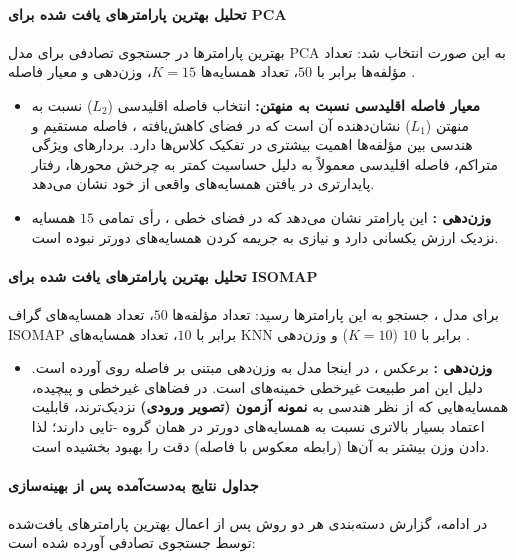 \documentclass{article}
\begin{document}
\paragraph{تحلیل بهترین پارامترهای یافت شده برای PCA}
بهترین پارامترها در جستجوی تصادفی برای مدل PCA به این صورت انتخاب شد: تعداد مؤلفه‌ها برابر با $50$، تعداد همسایه‌ها $K=15$، وزن‌دهی  و معیار فاصله . 
\begin{itemize}
	\item \textbf{معیار فاصله اقلیدسی نسبت به منهتن:} انتخاب فاصله اقلیدسی ($L_2$) نسبت به منهتن ($L_1$) نشان‌دهنده آن است که در فضای کاهش‌یافته ، فاصله مستقیم و هندسی بین مؤلفه‌ها اهمیت بیشتری در تفکیک کلاس‌ها دارد. بردارهای ویژگی متراکم، فاصله اقلیدسی معمولاً به دلیل حساسیت کمتر به چرخش محورها، رفتار پایدارتری در یافتن همسایه‌های واقعی از خود نشان می‌دهد.
	\item \textbf{وزن‌دهی :} این پارامتر نشان می‌دهد که در فضای خطی ، رأی تمامی $15$ همسایه نزدیک ارزش یکسانی دارد و نیازی به جریمه کردن همسایه‌های دورتر نبوده است.
\end{itemize}

\paragraph{تحلیل بهترین پارامترهای یافت شده برای ISOMAP}
برای مدل ، جستجو به این پارامترها رسید: تعداد مؤلفه‌ها $50$، تعداد همسایه‌های گراف ISOMAP برابر با $10$، تعداد همسایه‌های KNN برابر با $10$ ($K=10$) و وزن‌دهی .
\begin{itemize}
	\item \textbf{وزن‌دهی :} برعکس ، در اینجا مدل به وزن‌دهی مبتنی بر فاصله روی آورده است. دلیل این امر طبیعت غیرخطی خمینه‌های  است. در فضاهای غیرخطی و پیچیده، همسایه‌هایی که از نظر هندسی به \textbf{نمونه آزمون (تصویر ورودی)} نزدیک‌ترند، قابلیت اعتماد بسیار بالاتری نسبت به همسایه‌های دورتر در همان گروه -تایی دارند؛ لذا دادن وزن بیشتر به آن‌ها (رابطه معکوس با فاصله) دقت را بهبود بخشیده است.
\end{itemize}

\paragraph{جداول نتایج به‌دست‌آمده پس از بهینه‌سازی}
در ادامه، گزارش دسته‌بندی هر دو روش پس از اعمال بهترین پارامترهای یافت‌شده توسط جستجوی تصادفی آورده شده است:
\end{document}
